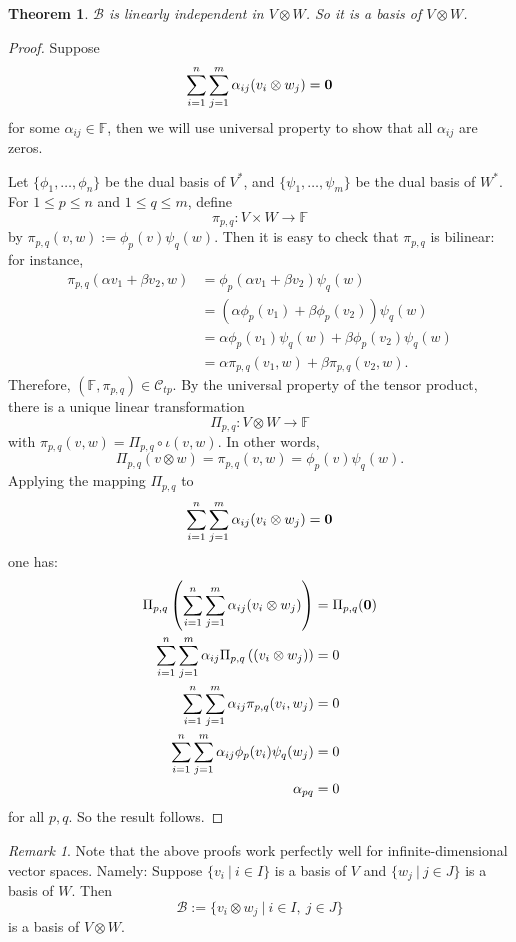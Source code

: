\documentclass[11pt,openany]{book}
\theoremstyle{plain}
\newtheorem{theorem}{Theorem}[chapter]
\theoremstyle{definition}
\theoremstyle{remark}
\newtheorem{remark}[remark]{Remark}
\begin{document}
\begin{theorem}
    $\mathcal{B}$ is linearly independent in $V \otimes W$. So it is a basis of $V \otimes W$.
\end{theorem}
\begin{proof}
Suppose
    \begin{align*}
\sum_{i=1}^n \sum^m_{j=1} \alpha_{ij} (v_i \otimes w_j) = {\bf 0}
\end{align*}
for some $\alpha_{ij} \in \mathbb{F}$, then we will use universal property to show that all $\alpha_{ij}$ are zeros.

Let $\{\phi_1, \dots ,\phi_n\}$ be the dual basis of $V^*$, and $\{\psi_1, \dots ,\psi_m\}$ be the dual basis of $W^*$. For $1 \leq p \leq n$ and $1 \leq q \leq m$, define
$$\pi_{p,q} : V \times W \to \mathbb{F}$$
by $\pi_{p,q}(v,w) := \phi_p(v) \psi_q(w)$. Then it is easy to check that $\pi_{p,q}$ is bilinear: for instance,
\begin{align*}
\pi_{p,q}(\alpha v_1 + \beta v_2,w) &= \phi_p( \alpha v_1 + \beta v_2) \psi_q(w) \\
&= (\alpha \phi_p(v_1) + \beta\phi_p(v_2)) \psi_q(w) \\
&= \alpha \phi_p(v_1) \psi_q(w) + \beta\phi_p(v_2) \psi_q(w) \\
&= \alpha \pi_{p,q}(v_1,w) + \beta\pi_{p,q}(v_2,w).
\end{align*}
Therefore, $(\mathbb{F}, \pi_{p,q}) \in \mathcal{C}_{tp}$. By the universal property of the tensor product, there is a unique linear transformation
$$\Pi_{p,q} : V \otimes W \to \mathbb{F}$$
with $\pi_{p,q}(v,w) = \Pi_{p,q} \circ \iota(v,w)$.
In other words,
$$\Pi_{p,q}(v \otimes w) = \pi_{p,q}(v,w) = \phi_p(v) \psi_q(w).$$
Applying the mapping $\Pi_{p,q}$ to
$$\sum_{i=1}^n \sum^m_{j=1} \alpha_{ij} (v_i \otimes w_j) = {\bf 0}$$
one has:
\begin{align*}
\Pi_{p,q}\left(\sum_{i=1}^n \sum^m_{j=1} \alpha_{ij} (v_i \otimes w_j)\right) &= \Pi_{p,q}({\bf 0}) \\
\sum_{i=1}^n \sum^m_{j=1} \alpha_{ij} \Pi_{p,q}\left((v_i \otimes w_j)\right) &= 0 \\
\sum_{i=1}^n \sum^m_{j=1} \alpha_{ij} \pi_{p,q}(v_i, w_j) &= 0 \\
\sum_{i=1}^n \sum^m_{j=1} \alpha_{ij} \phi_{p}(v_i)\psi_q(w_j) &= 0 \\
\alpha_{pq} &= 0
\end{align*}
for all $p, q$. So the result follows.
\end{proof}

\begin{remark} \label{rmk-inftensor}
    Note that the above proofs work perfectly well for infinite-dimensional vector spaces. Namely: 
    Suppose $\{v_i\ |\ i \in I\}$ is a basis of $V$ and $\{w_j\ |\ j \in J\}$ is a basis of $W$. Then
    $$\mathcal{B} := \{v_i \otimes w_j\ |\ i\in I,\ j \in J\}$$
    is a basis of $V \otimes W$.
\end{remark}
\end{document}
